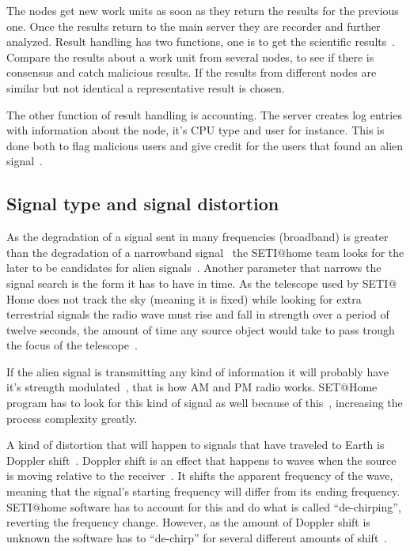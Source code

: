The nodes get new work units as soon as they return the results for the 
previous one. Once the results return to the main server they are recorder 
and further analyzed. Result handling has two functions, one is to 
get the scientific results~\cite{hid-sp18-601-paper-anderson2002seti}. 
Compare the results about a work unit from several nodes, to see if there 
is consensus and catch malicious results. 
If the results from different nodes are similar but not identical a 
representative result is chosen.

The other function of result handling is accounting. The server creates 
log entries with information about the node, it's CPU type and user for 
instance. This is done both to flag malicious users and give credit for
the users that found an alien signal~\cite{hid-sp18-601-paper-anderson2002seti}.

\subsection{Signal type and signal distortion}\label{hid-sp18-601-subsection-signal}
As the degradation of a signal sent in many frequencies (broadband) is greater 
than the degradation of a narrowband 
signal~\cite{hid-sp18-601-www-sathome-interference} the SETI$@$home team looks
 for the later to be candidates for alien 
 signals~\cite{hid-sp18-601-www-sathome-howworks}. Another parameter that 
 narrows the signal search is the form it has to have in time. As the telescope 
 used by SETI$@$Home does not track the sky (meaning it is fixed) while looking 
 for extra terrestrial signals the radio wave must rise and fall in strength 
 over a period of twelve seconds, the amount of time any source object would 
 take  to pass trough the focus of the 
 telescope~\cite{hid-sp18-601-www-sathome-interference}. 
 
 If the alien signal is transmitting any kind of information it will probably 
 have it's strength modulated~\cite{hid-sp18-601-book-gray1961radio}, that is
 how AM and PM radio works. SET$@$Home program has to look for this kind of 
 signal as well because of 
 this~\cite{hid-sp18-601-www-sathome-howworks}, increasing the process 
 complexity greatly.
 
 A kind of distortion that will happen to signals that have traveled to Earth
 is Doppler shift~\cite{hid-sp18-601-www-doppler-light}. Doppler shift is an 
 effect that happens to waves when the 
 source is moving relative to the receiver~\cite{hid-sp18-601-www-doppler}. 
 It shifts the apparent frequency 
 of the wave, meaning that the signal's starting frequency will differ from its 
 ending frequency. SETI$@$home software has to account for this and do what 
 is called ``de-chirping'', reverting the frequency change. However, as the 
 amount of Doppler shift is unknown  the software has to ``de-chirp'' for
 several  different amounts of shift~\cite{hid-sp18-601-www-sathome-howworks}.

